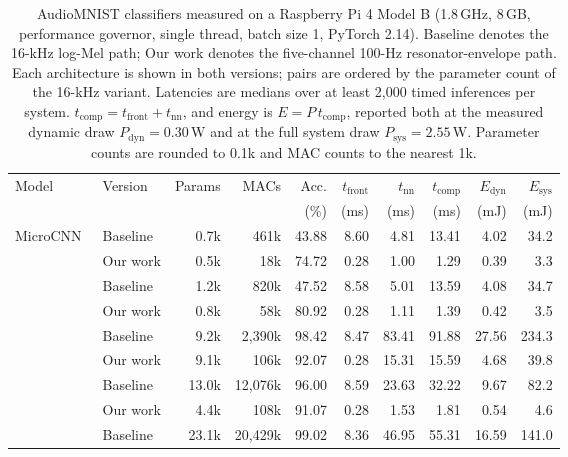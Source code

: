 \begin{table}[t]
\centering
\footnotesize
\setlength{\tabcolsep}{4pt}
\caption{AudioMNIST classifiers measured on a Raspberry Pi 4 Model B
(1.8\,GHz, 8\,GB, performance governor, single thread, batch size 1,
PyTorch 2.14). Baseline denotes the 16-kHz log-Mel path; Our work denotes the
five-channel 100-Hz resonator-envelope path. Each architecture is shown in
both versions; pairs are ordered by the parameter count of the 16-kHz variant.
Latencies are medians over at least 2,000 timed inferences per system.
$t_{\mathrm{comp}}=t_{\mathrm{front}}+t_{\mathrm{nn}}$, and energy is
$E=P\,t_{\mathrm{comp}}$, reported both at the measured dynamic draw
$P_{\mathrm{dyn}}=0.30$\,W and at the full system draw
$P_{\mathrm{sys}}=2.55$\,W. Parameter counts are rounded to 0.1k and MAC
counts to the nearest 1k.}
\label{tab:results}
\begin{tabular}{llrrrrrrrr}
\toprule
\multirow{2}{*}{Model} & \multirow{2}{*}{Version} &
\multirow{2}{*}{Params} & \multirow{2}{*}{MACs} & Acc. &
$t_{\mathrm{front}}$ & $t_{\mathrm{nn}}$ & $t_{\mathrm{comp}}$ &
$E_{\mathrm{dyn}}$ & $E_{\mathrm{sys}}$ \\
& & & & (\%) & (ms) & (ms) & (ms) & (mJ) & (mJ) \\
\midrule
\multirow{2}{*}{MicroCNN~\cite{tflmMicroSpeech}} & Baseline & 0.7k & 461k & 43.88 & 8.60 & 4.81 & 13.41 & 4.02 & 34.2 \\
& Our work & 0.5k & 18k & 74.72 & 0.28 & 1.00 & 1.29 & 0.39 & 3.3 \\
\addlinespace
\multirow{2}{*}{StrideCNN~\cite{sainath2015}} & Baseline & 1.2k & 820k & 47.52 & 8.58 & 5.01 & 13.59 & 4.08 & 34.7 \\
& Our work & 0.8k & 58k & 80.92 & 0.28 & 1.11 & 1.39 & 0.42 & 3.5 \\
\addlinespace
\multirow{2}{*}{BC-ResNet-1~\cite{kim2021}} & Baseline & 9.2k & 2,390k & 98.42 & 8.47 & 83.41 & 91.88 & 27.56 & 234.3 \\
& Our work & 9.1k & 106k & 92.07 & 0.28 & 15.31 & 15.59 & 4.68 & 39.8 \\
\addlinespace
\multirow{2}{*}{PoolCNN~\cite{sainath2015}} & Baseline & 13.0k & 12,076k & 96.00 & 8.59 & 23.63 & 32.22 & 9.67 & 82.2 \\
& Our work & 4.4k & 108k & 91.07 & 0.28 & 1.53 & 1.81 & 0.54 & 4.6 \\
\addlinespace
\multirow{2}{*}{DS-CNN~\cite{banbury2021}} & Baseline & 23.1k & 20,429k & 99.02 & 8.36 & 46.95 & 55.31 & 16.59 & 141.0 \\

\end{tabular}
\end{table}
